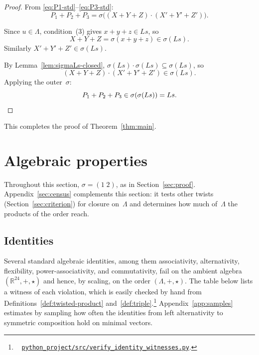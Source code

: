 \documentclass[twoside,english]{paper}
\numberwithin{equation}{section}
\numberwithin{figure}{section}
\theoremstyle{definition}
\theoremstyle{remark}
\newcommand{\RR}{\mathbb{R}}
\newcommand{\LL}{\Lambda}             %
\newcommand{\scriptref}[1]{\cite{repo}~%
  \href{https://github.com/koeplinger/leech\_alg/blob/main/python\_project/src/#1}%
  {\nolinkurl{python_project/src/#1}}}
\begin{document}
\begin{proof}
From \eqref{eq:P1-std}--\eqref{eq:P3-std}:
\begin{equation}\label{eq:disp5}
  P_1 + P_2 + P_3 = \sigma\bigl((X+Y+Z) \cdot (X'+Y'+Z')\bigr).
\end{equation}

Since $u \in \LL$, condition~(3) gives $x + y + z \in Ls$, so
\begin{equation}\label{eq:disp6}
  X + Y + Z = \sigma(x+y+z) \in \sigma(Ls).
\end{equation}
Similarly $X' + Y' + Z' \in \sigma(Ls)$.

By Lemma~\ref{lem:sigmaLs-closed}, $\sigma(Ls) \cdot \sigma(Ls) \subseteq \sigma(Ls)$, so
\begin{equation}\label{eq:disp7}
  (X+Y+Z) \cdot (X'+Y'+Z') \in \sigma(Ls).
\end{equation}
Applying the outer~$\sigma$:
\begin{equation}\label{eq:disp8}
  P_1 + P_2 + P_3 \in \sigma(\sigma(Ls)) = Ls. \qedhere
\end{equation}
\end{proof}

This completes the proof of Theorem~\ref{thm:main}.


\section{Algebraic properties}\label{sec:properties}

Throughout this section, $\sigma = (1\;2)$, as in
Section~\ref{sec:proof}.  Appendix~\ref{sec:census} complements this
section: it tests other twists (Section~\ref{sec:criterion}) for
closure on~$\LL$ and determines how much of~$\LL$ the products of the
order reach.

\subsection{Identities}\label{sec:identities}

Several standard algebraic identities, among them associativity,
alternativity, flexibility, power-associativity, and commutativity,
fail on the ambient algebra $(\RR^{24}, +, \star)$ and hence, by
scaling, on the order $(\LL, +, \star)$.  The table below lists a
witness of each violation, which is easily checked by hand from
Definitions~\ref{def:twisted-product}
and~\ref{def:triple}.\footnote{\scriptref{verify\_identity\_witnesses.py}.}
Appendix~\ref{app:samples} estimates by sampling how often the
identities from left alternativity to symmetric composition hold on
minimal vectors.
\end{document}
